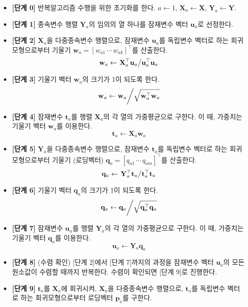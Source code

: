 \documentclass[]{book}
\providecommand{\tightlist}{%
  \setlength{\itemsep}{0pt}\setlength{\parskip}{0pt}}
\begin{document}
\begin{itemize}
\tightlist
\item
  \textbf{{[}단계 0{]}} 반복알고리즘 수행을 위한 초기화를 한다. \(a \leftarrow 1\), \(\mathbf{X}_a \leftarrow \mathbf{X}\), \(\mathbf{Y}_a \leftarrow \mathbf{Y}\).
\item
  \textbf{{[}단계 1{]}} 종속변수 행렬 \(\mathbf{Y}_a\)의 임의의 열 하나를 잠재변수 벡터 \(\mathbf{u}_a\)로 선정한다.
\item
  \textbf{{[}단계 2{]}} \(\mathbf{X}_a\)을 다중종속변수 행렬으로, 잠재변수 \(\mathbf{u}_a\)를 독립변수 벡터로 하는 회귀모형으로부터 기울기 \(\mathbf{w}_a = [w_{a1} \, \cdots \, w_{ak}]^\top\)를 산출한다.
  \[\mathbf{w}_a \leftarrow \left. \mathbf{X}_a^\top \mathbf{u}_a \middle/ \mathbf{u}_a^\top \mathbf{u}_a \right.  \]
\item
  \textbf{{[}단계 3{]}} 기울기 벡터 \(\mathbf{w}_a\)의 크기가 1이 되도록 한다.
  \[\left. \mathbf{w}_a \leftarrow \mathbf{w}_a \middle/ \sqrt{\mathbf{w}_a^\top \mathbf{w}_a} \right.\]
\item
  \textbf{{[}단계 4{]}} 잠재변수 \(\mathbf{t}_a\)를 행렬 \(\mathbf{X}_a\)의 각 열의 가중평균으로 구한다. 이 때, 가중치는 기울기 벡터 \(\mathbf{w}_a\)를 이용한다.
  \[\mathbf{t}_a \leftarrow \mathbf{X}_a \mathbf{w}_a\]
\item
  \textbf{{[}단계 5{]}} \(\mathbf{Y}_a\)을 다중종속변수 행렬으로, 잠재변수 \(\mathbf{t}_a\)를 독립변수 벡터로 하는 회귀모형으로부터 기울기 (로딩벡터) \(\mathbf{q}_a = [q_{a1} \, \cdots \, q_{am}]^\top\)를 산출한다.
  \[\mathbf{q}_a \leftarrow \left. \mathbf{Y}_a^\top \mathbf{t}_a \middle/ \mathbf{t}_a^\top \mathbf{t}_a \right.  \]
\item
  \textbf{{[}단계 6{]}} 기울기 벡터 \(\mathbf{q}_a\)의 크기가 1이 되도록 한다.
  \[\left. \mathbf{q}_a \leftarrow \mathbf{q}_a \middle/ \sqrt{\mathbf{q}_a^\top \mathbf{q}_a} \right.\]
\item
  \textbf{{[}단계 7{]}} 잠재변수 \(\mathbf{u}_a\)를 행렬 \(\mathbf{Y}_a\)의 각 열의 가중평균으로 구한다. 이 때, 가중치는 기울기 벡터 \(\mathbf{q}_a\)를 이용한다.
  \[\mathbf{u}_a \leftarrow \mathbf{Y}_a \mathbf{q}_a\]
\item
  \textbf{{[}단계 8{]}} (수렴 확인) {[}단계 2{]}에서 {[}단계 7{]}까지의 과정을 잠재변수 벡터 \(\mathbf{u}_a\)의 모든 원소값이 수렴할 때까지 반복한다. 수렴이 확인되면 {[}단계 9{]}로 진행한다.
\item
  \textbf{{[}단계 9{]}} \(\mathbf{t}_a\)를 \(\mathbf{X}_a\)에 회귀시켜, \(\mathbf{X}_a\)을 다중종속변수 행렬으로, \(\mathbf{t}_a\)를 독립변수 벡터로 하는 회귀모형으로부터 로딩벡터 \(\mathbf{p}_a\)를 구한다.

\end{itemize}
\end{document}
